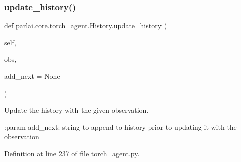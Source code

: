 \subsubsection{\texorpdfstring{update\+\_\+history()}{update\_history()}}
{\footnotesize\ttfamily def parlai.\+core.\+torch\+\_\+agent.\+History.\+update\+\_\+history (\begin{DoxyParamCaption}\item[{}]{self,  }\item[{}]{obs,  }\item[{}]{add\+\_\+next = {\ttfamily None} }\end{DoxyParamCaption})}

\begin{DoxyVerb}Update the history with the given observation.

:param add_next:
    string to append to history prior to updating it with the
    observation
\end{DoxyVerb}
 

Definition at line 237 of file torch\+\_\+agent.\+py.



